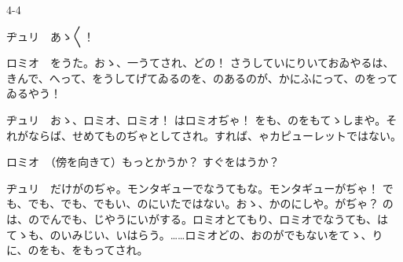 \documentclass[tate,paper=b6j,jafontsize=9pt]{jlreq}
\begin{document}
\begin{azconvIndented}{4\zw}{-4\zw}

ヂュリ　あゝ{〳〵}！

ロミオ　をうた。おゝ、一うてされ、どの！ さうしていにりいておゐやるは、きんで、へって、をうしてげてゐるのを、のあるのが、かにふにって、のをってゐるやう！

ヂュリ　おゝ、ロミオ、ロミオ！ はロミオぢゃ！ をも、のをもてゝしまや。それがならば、せめてものぢゃとしてされ。すれば、ゃカピューレットではない。

ロミオ　（傍を向きて）もっとかうか？ すぐをはうか？

ヂュリ　だけがのぢゃ。モンタギューでなうてもな。モンタギューがぢゃ！ でも、でも、でも、でもい、のにいたではない。おゝ、かのにしや。がぢゃ？ のは、のでんでも、じやうにいがする。ロミオとてもり、ロミオでなうても、はてゝも、のいみじい、いはらう。……ロミオどの、おのがでもないをてゝ、りに、のをも、をもってされ。


\end{azconvIndented}
\end{document}
